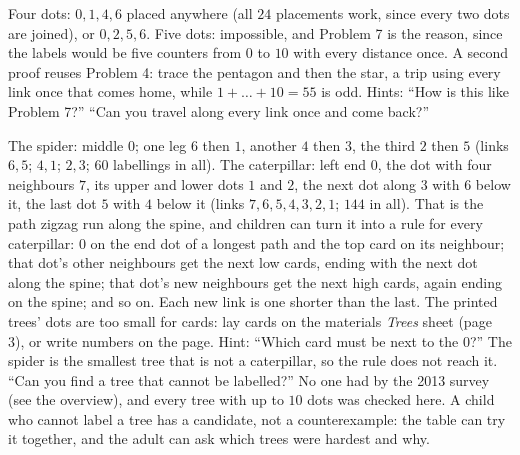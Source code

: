 Four dots: $0,1,4,6$ placed anywhere (all $24$ placements work, since every two dots are joined), or $0,2,5,6$. Five dots: impossible, and Problem 7 is the reason, since the labels would be five counters from $0$ to $10$ with every distance once. A second proof reuses Problem 4: trace the pentagon and then the star, a trip using every link once that comes home, while $1+\dots+10=55$ is odd. Hints: ``How is this like Problem 7?'' ``Can you travel along every link once and come back?''

The spider: middle $0$; one leg $6$ then $1$, another $4$ then $3$, the third $2$ then $5$ (links $6,5$; $4,1$; $2,3$; $60$ labellings in all). The caterpillar: left end $0$, the dot with four neighbours $7$, its upper and lower dots $1$ and $2$, the next dot along $3$ with $6$ below it, the last dot $5$ with $4$ below it (links $7,6,5,4,3,2,1$; $144$ in all). That is the path zigzag run along the spine, and children can turn it into a rule for every caterpillar: $0$ on the end dot of a longest path and the top card on its neighbour; that dot's other neighbours get the next low cards, ending with the next dot along the spine; that dot's new neighbours get the next high cards, again ending on the spine; and so on. Each new link is one shorter than the last. The printed trees' dots are too small for cards: lay cards on the materials \emph{Trees} sheet (page 3), or write numbers on the page. Hint: ``Which card must be next to the $0$?'' The spider is the smallest tree that is not a caterpillar, so the rule does not reach it. ``Can you find a tree that cannot be labelled?'' No one had by the 2013 survey (see the overview), and every tree with up to $10$ dots was checked here. A child who cannot label a tree has a candidate, not a counterexample: the table can try it together, and the adult can ask which trees were hardest and why.

